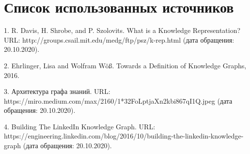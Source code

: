 \clearpage                                  %
\chapter*{Список использованных источников}	
\label{references}




1. R. Davis, H. Shrobe, and P. Szolovits. What is a Knowledge Representation? URL: http://groups.csail.mit.edu/medg/ftp/psz/k-rep.html (дата обращения: 20.10.2020).

2. Ehrlinger, Lisa and Wolfram Wöß. Towards a Definition of Knowledge Graphs, 2016.

3. Архитектура графа знаний. URL: https://miro.medium.com/max/2160/1*32FoLptjaXn2kbi867qI1Q.jpeg (дата обращения: 20.10.2020).

4. Building The LinkedIn Knowledge Graph. URL: https://engineering.linkedin.com/blog/2016/10/building-the-linkedin-knowledge-graph (дата обращения: 20.10.2020).

